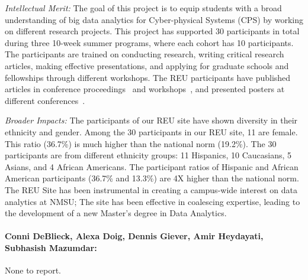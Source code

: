 \noindent\textit{Intellectual Merit:} 
The goal of this project is to equip students with a broad understanding of big data analytics for Cyber-physical Systems (CPS) by working on different research projects. This project has supported 30 participants in total during three 10-week summer programs, where each cohort has 10 participants. The participants are trained on conducting research, writing critical research articles, making effective presentations, and applying for graduate schools and fellowships through different workshops. 
The REU participants have published articles in conference proceedings~\cite{reu2,reu3} and workshops~\cite{reu1,reu7}, and presented posters at different conferences~\cite{reu4,reu5,reu6,reu10}.


\noindent\textit{Broader Impacts:} 
The participants of our REU site have shown diversity in their ethnicity and gender.
Among the 30 participants in our REU site, 11 are female. 
This ratio (36.7\%) is much higher than the national norm (19.2\%). 
%
The 30 participants are from different ethnicity groups: 11 Hispanics, 10 Caucasians,  5 Asians, and 4 African Americans.  The participant ratios of  Hispanic and African American participants  (36.7\% and 13.3\%) are 4X higher than the national norm. The REU Site has been instrumental in creating a campus-wide interest on data analytics at NMSU; The site has  been effective in coalescing expertise, leading to  the development of a new Master's degree in Data Analytics.

\paragraph{Conni DeBlieck, Alexa Doig, Dennis Giever, Amir Heydayati, Subhasish Mazumdar:} None to report.

